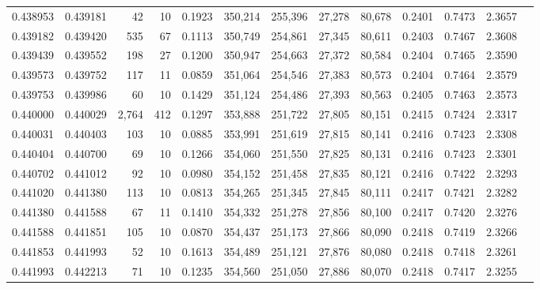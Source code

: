 \begin{tabular}{rrrrrrrrrrrrr}
0.438953 & 0.439181 &    42 &  10 &                                     0.1923 & 350,214 & 255,396 &  27,278 &  80,678 & 0.2401 & 0.7473 & 2.3657 \\
0.439182 & 0.439420 &   535 &  67 &                                     0.1113 & 350,749 & 254,861 &  27,345 &  80,611 & 0.2403 & 0.7467 & 2.3608 \\
0.439439 & 0.439552 &   198 &  27 &                                     0.1200 & 350,947 & 254,663 &  27,372 &  80,584 & 0.2404 & 0.7465 & 2.3590 \\
0.439573 & 0.439752 &   117 &  11 &                                     0.0859 & 351,064 & 254,546 &  27,383 &  80,573 & 0.2404 & 0.7464 & 2.3579 \\
0.439753 & 0.439986 &    60 &  10 &                                     0.1429 & 351,124 & 254,486 &  27,393 &  80,563 & 0.2405 & 0.7463 & 2.3573 \\
0.440000 & 0.440029 & 2,764 & 412 &                                     0.1297 & 353,888 & 251,722 &  27,805 &  80,151 & 0.2415 & 0.7424 & 2.3317 \\
0.440031 & 0.440403 &   103 &  10 &                                     0.0885 & 353,991 & 251,619 &  27,815 &  80,141 & 0.2416 & 0.7423 & 2.3308 \\
0.440404 & 0.440700 &    69 &  10 &                                     0.1266 & 354,060 & 251,550 &  27,825 &  80,131 & 0.2416 & 0.7423 & 2.3301 \\
0.440702 & 0.441012 &    92 &  10 &                                     0.0980 & 354,152 & 251,458 &  27,835 &  80,121 & 0.2416 & 0.7422 & 2.3293 \\
0.441020 & 0.441380 &   113 &  10 &                                     0.0813 & 354,265 & 251,345 &  27,845 &  80,111 & 0.2417 & 0.7421 & 2.3282 \\
0.441380 & 0.441588 &    67 &  11 &                                     0.1410 & 354,332 & 251,278 &  27,856 &  80,100 & 0.2417 & 0.7420 & 2.3276 \\
0.441588 & 0.441851 &   105 &  10 &                                     0.0870 & 354,437 & 251,173 &  27,866 &  80,090 & 0.2418 & 0.7419 & 2.3266 \\
0.441853 & 0.441993 &    52 &  10 &                                     0.1613 & 354,489 & 251,121 &  27,876 &  80,080 & 0.2418 & 0.7418 & 2.3261 \\
0.441993 & 0.442213 &    71 &  10 &                                     0.1235 & 354,560 & 251,050 &  27,886 &  80,070 & 0.2418 & 0.7417 & 2.3255 \\

\end{tabular}
